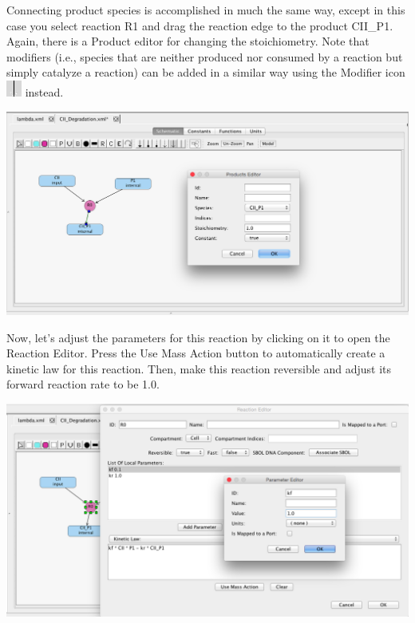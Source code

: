 \documentclass[titlepage,11pt]{article}
\begin{document}
Connecting product species is accomplished in much the same way, except in this case you select reaction R1 and drag the reaction edge to the product CII\_P1.  Again, there is a Product editor for changing the stoichiometry.  Note that modifiers (i.e., species that are neither produced nor consumed by a reaction but simply catalyze a reaction) can be added in a similar way using the Modifier icon \includegraphics{../gui/icons/modelview/modifier_selected} instead.

\begin{center}
\includegraphics[width=160mm]{screenshots/product}
\end{center}

Now, let's adjust the parameters for this reaction by clicking on it to open the Reaction Editor. Press the Use Mass Action button to automatically create a kinetic law for this reaction.  Then, make this reaction reversible and adjust its forward reaction rate to be 1.0.  

\begin{center}
\includegraphics[width=160mm]{screenshots/localParam}
\end{center}
\end{document}
